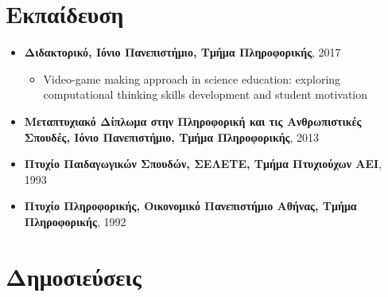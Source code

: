 \documentclass[%
    11pt,
  oneside
  ]{memoir}
\let\oldsection\section
\renewcommand{\section}[1]{%
  \oldsection{#1}
  \leavevmode
  \par
  \vspace{\dimexpr-\baselineskip-\parskip}
}
\begin{document}
\hypertarget{ux3b5ux3baux3c0ux3b1ux3afux3b4ux3b5ux3c5ux3c3ux3b7}{%
\section{Εκπαίδευση}\label{ux3b5ux3baux3c0ux3b1ux3afux3b4ux3b5ux3c5ux3c3ux3b7}}

\begin{itemize}
\tightlist
\item
  \textbf{Διδακτορικό, Ιόνιο Πανεπιστήμιο, Τμήμα Πληροφορικής}, 2017

  \begin{itemize}
  \tightlist
  \item
    Video-game making approach in science education: exploring
    computational thinking skills development and student motivation
  \end{itemize}
\item
  \textbf{Μεταπτυχιακό Δίπλωμα στην Πληροφορική και τις Ανθρωπιστικές
  Σπουδές, Ιόνιο Πανεπιστήμιο, Τμήμα Πληροφορικής}, 2013
\item
  \textbf{Πτυχίο Παιδαγωγικών Σπουδών, ΣΕΛΕΤΕ, Τμήμα Πτυχιούχων ΑΕΙ},
  1993
\item
  \textbf{Πτυχίο Πληροφορικής, Οικονομικό Πανεπιστήμιο Αθήνας, Τμήμα
  Πληροφορικής}, 1992
\end{itemize}

\hypertarget{ux3b4ux3b7ux3bcux3bfux3c3ux3b9ux3b5ux3cdux3c3ux3b5ux3b9ux3c2}{%
\section{Δημοσιεύσεις}\label{ux3b4ux3b7ux3bcux3bfux3c3ux3b9ux3b5ux3cdux3c3ux3b5ux3b9ux3c2}}
\end{document}
